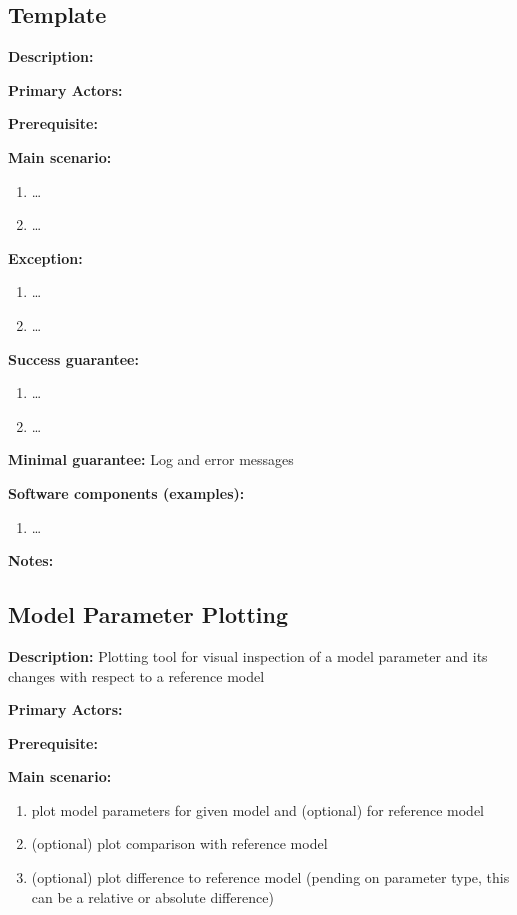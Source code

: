 \subsection{Template}

\label{validation:Template}
\textbf{Description:}

\textbf{Primary Actors:}

\textbf{Prerequisite:}

\textbf{Main scenario:}

\begin{enumerate}
    \item \dots
    \item \dots
\end{enumerate}

\textbf{Exception:}
\begin{enumerate}
    \item \dots
    \item \dots
\end{enumerate}

\textbf{Success guarantee:}
\begin{enumerate}
    \item \dots
    \item \dots
\end{enumerate}

\textbf{Minimal guarantee:}
Log and error messages

\textbf{Software components (examples):}
\begin{enumerate}
    \item \dots
\end{enumerate}

\textbf{Notes:}



\subsection{Model Parameter Plotting}
\label{validation:ModelParameterPlotting}
\textbf{Description:}
Plotting tool for visual inspection of a model parameter and its changes with respect to a reference model

\textbf{Primary Actors:}

\textbf{Prerequisite:}

\textbf{Main scenario:}

\begin{enumerate}
    \item plot model parameters for given model and (optional) for reference model
    \item (optional) plot comparison with reference model
    \item (optional) plot difference to reference model (pending on parameter type, this can be a relative or absolute difference)
\end{enumerate}

